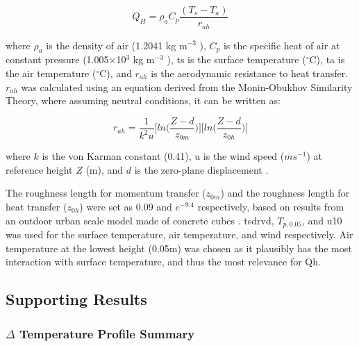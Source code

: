 \documentclass[final,3p,times,authoryear]{elsarticle}
\begin{document}
\begin{equation}
Q_{H} = \rho_{a}C_{p} \frac{ (T_{s} - T_{a}) }{r_{ah}}
\label{eq:7.12}
\end{equation}

where $\rho_{a}$ is the density of air (1.2041 kg m$^{-3}$ ), $C_{p}$ is the specific heat of air at constant pressure (1.005$\times$10$^{3}$ kg m$^{-3}$ ), \gls{ts} is the surface temperature ($^{\circ}$C), \gls{ta} is the air temperature ($^{\circ}$C), and $r_{ah}$ is the aerodynamic resistance to heat transfer. $r_{ah}$ was calculated using an equation derived from the Monin-Obukhov Similarity Theory, where assuming neutral conditions, it can be written as:

\begin{equation}
r_{ah} = \frac{1}{k^{2}u}\bigg[ln\bigg( \frac{Z-d}{z_{0m}} \bigg) \bigg] \bigg[ln\bigg( \frac{Z-d}{z_{0h}} \bigg) \bigg]
\label{eq:7.13}
\end{equation}

where $k$ is the von Karman constant (0.41), \gls{u} is the wind speed ($ms^{-1}$) at reference
height $Z$ (m), and $d$ is the zero-plane displacement \citep{Liu2007}.

The roughness length for momentum transfer ($z_{0m}$) and the roughness length for heat transfer ($z_{0h}$) were set as 0.09 and $e^{-9.4}$ respectively, based on results from an outdoor urban scale model made of concrete cubes \citep{Kanda2007}. \gls{tsdrvd}, $T_{p,0.05}$, and \gls{u10} was used for the surface temperature, air temperature, and wind respectively. Air temperature at the lowest height (0.05m) was chosen as it plausibly has the most interaction with surface temperature, and thus the most relevance for \gls{Qh}.



\subsection{Supporting Results}\label{sec:appendix7.5}
\subsubsection{$\Delta$ Temperature Profile Summary}\label{sec:appendix7.5.1}
\end{document}
